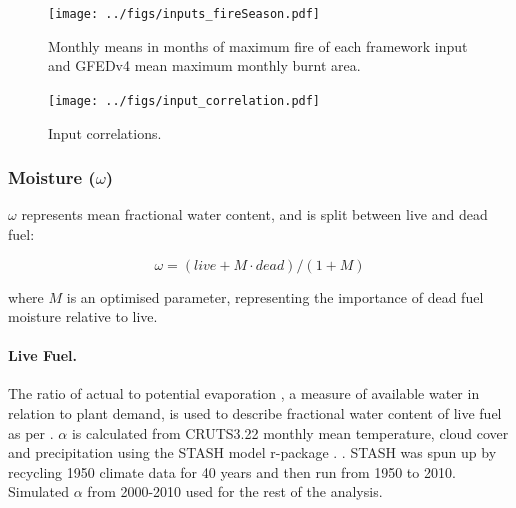 \begin{figure}[!ht]
  \centering
    \texttt{[image: ../figs/inputs\_fireSeason.pdf]}
  \caption{Monthly means in months of maximum fire of each framework input  and GFEDv4 mean maximum monthly burnt area.}
  \label{fig:Season_mean_ins}
\end{figure}

\begin{figure}[!ht]
  \centering
    \texttt{[image: ../figs/input\_correlation.pdf]}
  \caption{Input correlations.}
  \label{fig:Corr_ins}
\end{figure}

\subsubsection{Moisture ($\omega$)}

$\omega$ represents mean fractional water content, and is split between live and dead fuel:

\begin{equation}
    \omega = (live + M \cdot dead) / (1 + M)
\end{equation}

where $M$ is an optimised parameter, representing the importance of dead fuel moisture relative to live.

\paragraph{Live Fuel.}
The ratio of actual to potential evaporation \citep[$\alpha$][]{prentice1993simulation}, a measure of available water in relation to plant demand, is used to describe fractional water content of live fuel as per \citet{harrison2010fire, bistinas2014causal}.
$\alpha$ is calculated from CRUTS3.22 monthly mean temperature, cloud cover and precipitation using the STASH model \citep{sykes1996bioclimatic} r-package \citep{rstash}. . STASH was spun up by recycling 1950 climate data for 40 years and then run from 1950 to 2010. Simulated $\alpha$ from 2000-2010 used for the rest of the analysis.

